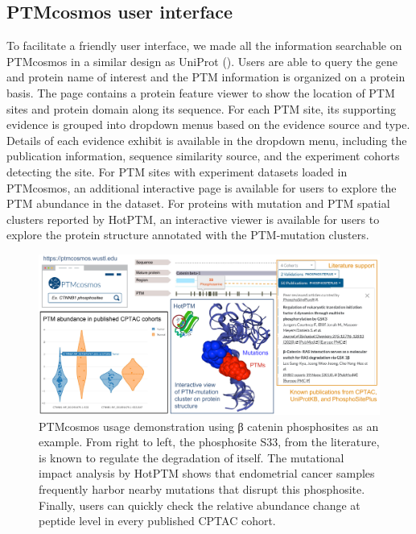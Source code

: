 \subsection{PTMcosmos user interface}
To facilitate a friendly user interface, we made all the information searchable on PTMcosmos in a similar design as UniProt (). Users are able to query the gene and protein name of interest and the PTM information is organized on a protein basis. The page contains a protein feature viewer to show the location of PTM sites and protein domain along its sequence. For each PTM site, its supporting evidence is grouped into dropdown menus based on the evidence source and type. Details of each evidence exhibit is available in the dropdown menu, including the publication information, sequence similarity source, and the experiment cohorts detecting the site. For PTM sites with experiment datasets loaded in PTMcosmos, an additional interactive page is available for users to explore the PTM abundance in the dataset. For proteins with mutation and PTM spatial clusters reported by HotPTM, an interactive viewer is available for users to explore the protein structure annotated with the PTM-mutation clusters.

\begin{figure}[tb]
    \centering
    \includegraphics[width=\linewidth]{figures/chap03_ptmcosmos/figure3_ptmcosmos_usage.pdf}
    \caption[PTMcosmos usage demonstration.]{%
        PTMcosmos usage demonstration using β catenin phosphosites as an example. From right to left, the phosphosite S33, from the literature, is known to regulate the degradation of itself. The mutational impact analysis by HotPTM shows that endometrial cancer samples frequently harbor nearby mutations that disrupt this phosphosite. Finally, users can quickly check the relative abundance change at peptide level in every published CPTAC cohort.
    }
    \label{fig:ptmcosmos-usage-demo}
\end{figure}


